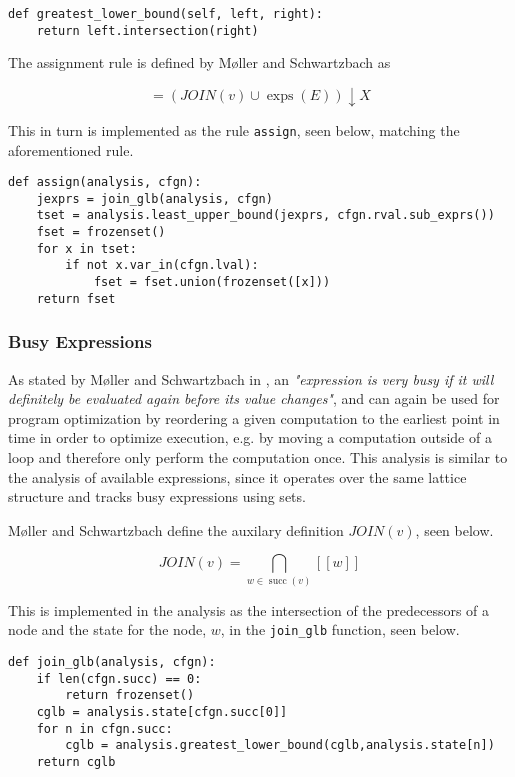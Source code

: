 \begin{verbatim}
def greatest_lower_bound(self, left, right): 
    return left.intersection(right)
\end{verbatim}

\noindent The assignment rule is defined by Møller and Schwartzbach as

\begin{equation*}
    [v]=(J O I N(v) \cup \operatorname{exps}(E)) \downarrow X
\end{equation*}

\noindent This in turn is implemented as the rule \texttt{assign}, seen below, matching the aforementioned rule. 

\begin{verbatim}
def assign(analysis, cfgn):
    jexprs = join_glb(analysis, cfgn)
    tset = analysis.least_upper_bound(jexprs, cfgn.rval.sub_exprs())
    fset = frozenset()
    for x in tset:
        if not x.var_in(cfgn.lval):
            fset = fset.union(frozenset([x]))
    return fset
\end{verbatim}

\subsubsection{Busy Expressions}
As stated by Møller and Schwartzbach in \cite{spa}, an \textit{"expression is very busy if it will definitely be evaluated again before its value changes"}, and can again be used for program optimization by reordering a given computation to the earliest point in time in order to optimize execution, e.g. by moving a computation outside of a loop and therefore only perform the computation once. This analysis is similar to the analysis of available expressions, since it operates over the same lattice structure and tracks busy expressions using sets.

\newpar Møller and Schwartzbach define the auxilary definition $JOIN(v)$, seen below. 

\begin{equation*}
    J O I N (v) = \mathop{\bigcap}_{w \in \operatorname{succ}(v)} [[w]]
\end{equation*}

\noindent This is implemented in the analysis as the intersection of the predecessors of a node and the state for the node, $w$, in the \texttt{join\_glb} function, seen below. 

\begin{verbatim}
def join_glb(analysis, cfgn):
    if len(cfgn.succ) == 0:
        return frozenset()
    cglb = analysis.state[cfgn.succ[0]]
    for n in cfgn.succ:
        cglb = analysis.greatest_lower_bound(cglb,analysis.state[n])
    return cglb
\end{verbatim}

